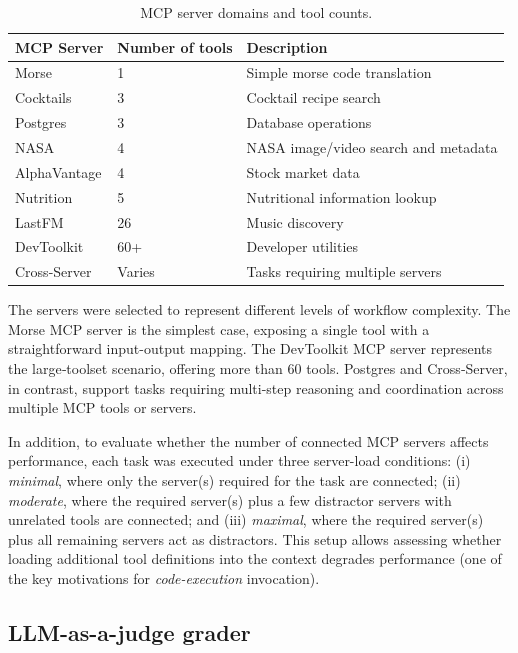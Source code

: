 \documentclass[runningheads]{llncs}
\begin{document}
\begin{table}
\caption{MCP server domains and tool counts.}\label{tab:servers}
\centering
\begin{tabular}{|l|l|p{6cm}|}
\hline
\textbf{MCP Server} & \textbf{Number of tools} & \textbf{Description} \\
\hline
Morse & 1 & Simple morse code translation \\
Cocktails & 3 & Cocktail recipe search \\
Postgres & 3 & Database operations \\
NASA & 4 & NASA image/video search and metadata \\
AlphaVantage & 4 & Stock market data  \\
Nutrition & 5 & Nutritional information lookup \\
LastFM & 26 & Music discovery \\
DevToolkit & 60+ & Developer utilities \\
Cross-Server & Varies & Tasks requiring multiple servers \\
\hline
\end{tabular}
\end{table}

The servers were selected to represent different levels of workflow complexity. The Morse MCP server is the simplest case, exposing a single tool with a straightforward input-output mapping. The DevToolkit MCP server represents the large‑toolset scenario, offering more than 60 tools. Postgres and Cross‑Server, in contrast, support tasks requiring multi-step reasoning and coordination across multiple MCP tools or servers.

In addition, to evaluate whether the number of connected MCP servers affects performance, each task was executed under three server-load conditions: (i) \textit{minimal}, where only the server(s) required for the task are connected; (ii) \textit{moderate}, where the required server(s) plus a few distractor servers with unrelated tools are connected; and (iii) \textit{maximal}, where the required server(s) plus all remaining servers act as distractors. This setup allows assessing whether loading additional tool definitions into the context degrades performance (one of the key motivations for \textit{code-execution} invocation).

\subsection{LLM-as-a-judge grader}
\end{document}
